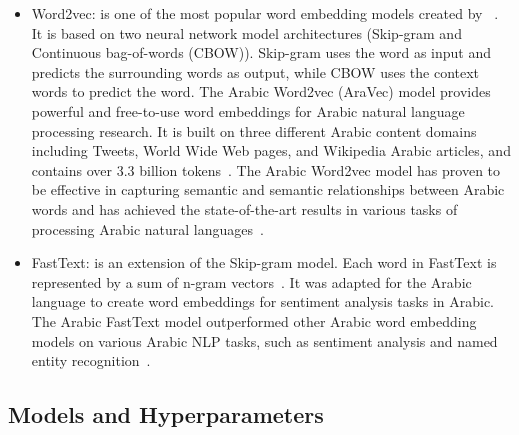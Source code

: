 \documentclass[sn-mathphys,Numbered]{sn-jnl}%
\begin{document}
\begin{itemize}
\begin{itemize}
    \item Word2vec: is one of the most popular word embedding models created by ~\citet{mikolov2013efficient}. It is based on two neural network model architectures (Skip-gram and Continuous bag-of-words (CBOW)). Skip-gram uses the word as input and predicts the surrounding words as output, while CBOW uses the context words to predict the word. The Arabic Word2vec (AraVec) model provides powerful and free-to-use word embeddings for Arabic natural language processing research. It is built on three different Arabic content domains including Tweets, World Wide Web pages, and Wikipedia Arabic articles, and contains over $3.3$ billion tokens~\cite{SOLIMAN2017256}. The Arabic Word2vec model has proven to be effective in capturing semantic and semantic relationships between Arabic words and has achieved the state-of-the-art results in various tasks of processing Arabic natural languages~\cite{doi:10.1137/1.9781611974010.66,HEIKAL2018114}.
 \item FastText: is an extension of the Skip-gram model. %
Each word in FastText is represented by a sum of n-gram vectors~\cite{athiwaratkun2018probabilistic}. It was adapted for the Arabic language to create word embeddings for sentiment analysis tasks in Arabic. The Arabic FastText model outperformed other Arabic word embedding models on various Arabic NLP tasks, such as sentiment analysis and named entity recognition~\cite{computers12060126}.
\end{itemize}

\end{itemize}



\subsection{Models and Hyperparameters}%
~\label{subSec:training} 

\end{document}
